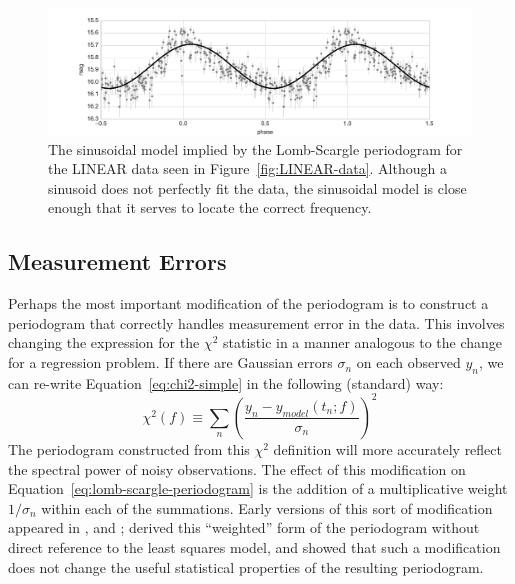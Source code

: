 \documentclass[preprint]{aastex}
\newcommand{\fig}[1]{Figure~\ref{fig:#1}}
\newcommand{\figlabel}[1]{\label{fig:#1}}
\newcommand{\Eq}[1]{Equation~\ref{eq:#1}}
\newcommand{\eq}[1]{\Eq{#1}}
\newcommand{\eqlabel}[1]{\label{eq:#1}}
\newcommand{\sectlabel}[1]{\label{sect:#1}}
\begin{document}
\begin{figure}[ht]
  \centering
  \includegraphics[width=\textwidth]{fig18_ls_model}
  \caption{The sinusoidal model implied by the Lomb-Scargle periodogram for
    the LINEAR data seen in \fig{LINEAR-data}.
    Although a sinusoid does not perfectly fit the data, the sinusoidal model
    is close enough that it serves to locate the correct frequency.
    \figlabel{ls-model}}
\end{figure}


\subsection{Measurement Errors}
\sectlabel{extensions-observational-noise}
Perhaps the most important modification of the periodogram is to
construct a periodogram that correctly handles measurement error in the data.
This involves changing the expression for the $\chi^2$ statistic in a manner
analogous to the change for a regression problem.
If there are Gaussian errors $\sigma_n$ on each observed $y_n$, we can re-write \eq{chi2-simple} in the following (standard) way:
\begin{equation}
  \chi^2(f) \equiv \sum_n \left(\frac{y_n - y_{model}(t_n;f)}{\sigma_n}\right)^2
  \eqlabel{chi2-with-errors}
\end{equation}
The periodogram constructed from this $\chi^2$ definition will more accurately
reflect the spectral power of noisy observations.
The effect of this modification on \eq{lomb-scargle-periodogram} is the addition
of a multiplicative weight $1/\sigma_n$ within each of the summations.
Early versions of this sort of modification appeared in \citet{Gilliland87}, and
\citet{Irwin89}; \citet{Scargle89} derived this ``weighted'' form of the
periodogram without direct reference to the least squares model,
and \citet{Zechmeister09} showed that such a modification does not change
the useful statistical properties of the resulting periodogram.
\end{document}
